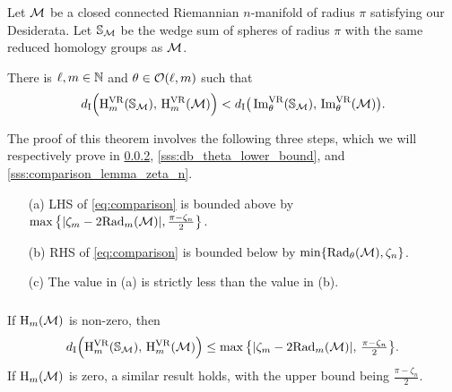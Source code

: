 \subsubsection{}\label{sss:choice of S_M}

Let \(\mathcal{M}\) be a closed connected Riemannian \(n\)-manifold of radius \(\pi\) satisfying our Desiderata.
Let $\mathbb{S}_{\mathcal{M}}$ be the wedge sum of spheres of radius \(\pi\) with the same reduced homology groups as $\mathcal{M}$.

\theorem
There is $\ell, m \in \mathbb{N}$ and $\theta \in \mathcal{O}(\ell, m)$ such that
\begin{equation}\label{eq:comparison}
	d_{\mathrm{I}} \Big(\mathrm{H}^{\mathrm{VR}}_{m}(\mathbb{S}_{\mathcal{M}}),\, \mathrm{H}^{\mathrm{VR}}_{m}(\mathcal{M})\Big) < d_{\mathrm{I}} \big(\operatorname{Im}^{\mathrm{VR}}_{\theta}(\mathbb{S}_{\mathcal{M}}),\, \operatorname{Im}^{\mathrm{VR}}_{\theta}(\mathcal{M})\big).
\end{equation}

The proof of this theorem involves the following three steps, which we will respectively prove in \cref{sss:db_upper_bound}, \cref{sss:db_theta_lower_bound}, and \cref{sss:comparison_lemma_zeta_n}.
\begin{enumerate}
	\item [(a)] LHS of \cref{eq:comparison} is bounded above by $\max\big\{|\zeta_m - 2\mathrm{Rad}_{m}(\mathcal{M}) |, \tfrac{\pi - \zeta_n}{2}\big\}$.
	\item [(b)] RHS of \cref{eq:comparison} is bounded below by $\min\{\mathrm{Rad}_{\theta}(\mathcal{M}), \zeta_n\}$.
	\item [(c)] The value in (a) is strictly less than the value in (b).
\end{enumerate}

\subsubsection{}\label{sss:db_upper_bound}

\lemma
If \(\operatorname{H}_m(\mathcal{M})\) is non-zero, then
\begin{equation}\label{eq:db_usual_upper_bound}
	d_{\mathrm{I}}\Big(\mathrm{H}^{\mathrm{VR}}_{m}(\mathbb{S}_{\mathcal{M}}),\, \mathrm{H}^{\mathrm{VR}}_{m}(\mathcal{M})\Big)
	\leq \max\big\{|\zeta_m - 2\mathrm{Rad}_{m}(\mathcal{M}) |,\, \tfrac{\pi - \zeta_n}{2}\big\}.
\end{equation}
If \(\operatorname{H}_m(\mathcal{M})\) is zero, a similar result holds, with the upper bound being $\tfrac{\pi - \zeta_n}{2}$.

